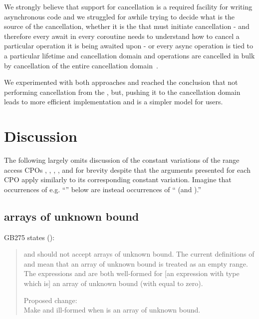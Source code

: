 We strongly believe that support for cancellation is a required facility for writing asynchronous code and we struggled for awhile trying to decide what is the source of the cancellation, whether it is the  that must initiate cancellation - and therefore every await in every coroutine needs to understand how to cancel a particular operation it is being awaited upon - or every async operation is tied to a particular lifetime and cancellation domain and operations are cancelled in bulk by cancellation of the entire cancellation domain~\cite{p0399r0}.

We experimented with both approaches and reached the conclusion that not performing cancellation from the , but, pushing it to the cancellation domain leads to more efficient implementation and is a simpler model for users.






\chapter{Discussion}

The following largely omits discussion of the constant variations of the range access CPOs
, , , , and 
for brevity despite that the arguments presented for each CPO apply similarly
to its corresponding constant variation.
Imagine that occurrences of e.g. ``'' below
are instead occurrences of `` (and ).''

\section{arrays of unknown bound}
GB275 states (\cite{GB275}):
\begin{quote}
 and  should not accept arrays of unknown bound.
The current definitions of  and 
mean that an array of unknown bound is treated as an empty range.
The expressions  and  are both well-formed
for [an expression  with type  which is] an array of unknown bound
(with  equal to zero).

Proposed change: \\
Make  and  ill-formed
when  is an array of unknown bound.
\end{quote}

